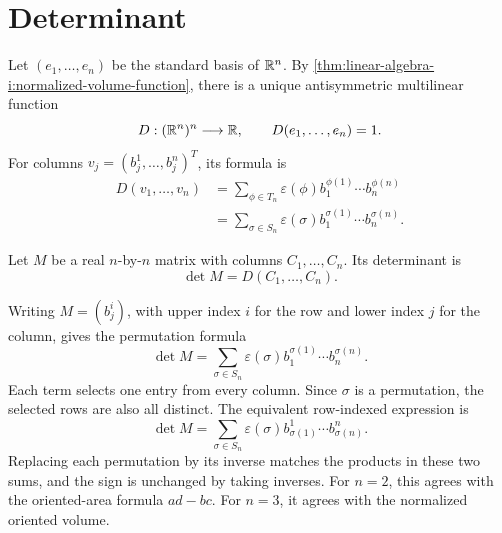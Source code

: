\section{Determinant}
\label{sec:linear-algebra-i:determinant}

Let \((e_1,\ldots,e_n)\) be the standard basis of \(\mathbb{R}^n\).
By \autoref{thm:linear-algebra-i:normalized-volume-function}, there
is a unique antisymmetric multilinear function
\[
  D:(\mathbb{R}^n)^n\longrightarrow\mathbb{R},\qquad D(e_1,\ldots,e_n)=1.
\]
For columns \(v_j=(b^1_j,\ldots,b^n_j)^T\), its formula is
\[
  \begin{aligned}
    D(v_1,\ldots,v_n)
      &=\sum_{\phi\in T_n}\varepsilon(\phi)
        b^{\phi(1)}_1\cdots b^{\phi(n)}_n\\
      &=\sum_{\sigma\in S_n}\varepsilon(\sigma)
        b^{\sigma(1)}_1\cdots b^{\sigma(n)}_n.
  \end{aligned}
\]

\begin{definition}
  Let \(M\) be a real \(n\)-by-\(n\) matrix with columns \(C_1,\ldots,C_n\).
  Its determinant is
  \[
    \det M=D(C_1,\ldots,C_n).
  \]
\end{definition}

Writing \(M=(b^i_j)\), with upper index \(i\) for the row and lower
index \(j\) for the column, gives the permutation formula
\begin{equation}
  \det M=\sum_{\sigma\in S_n}\varepsilon(\sigma)
    b^{\sigma(1)}_1\cdots b^{\sigma(n)}_n.
  \label{eq:linear-algebra-i:determinant-permutation-formula}
\end{equation}
Each term selects one entry from every column. Since \(\sigma\) is a
permutation, the selected rows are also all distinct. The equivalent
row-indexed expression is
\[
  \det M=\sum_{\sigma\in S_n}\varepsilon(\sigma)
    b^1_{\sigma(1)}\cdots b^n_{\sigma(n)}.
\]
Replacing each permutation by its inverse matches the products in these
two sums, and the sign is unchanged by taking inverses.
For \(n=2\), this agrees with the oriented-area formula \(ad-bc\).
For \(n=3\), it agrees with the normalized oriented volume.

